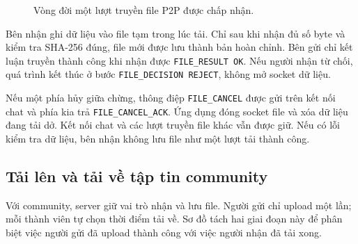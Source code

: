 \begin{figure}[H]
\centering
{}
\caption{Vòng đời một lượt truyền file P2P được chấp nhận.}
\label{fig:seq-file-private}
\end{figure}

Bên nhận ghi dữ liệu vào file tạm trong lúc tải. Chỉ sau khi nhận đủ số byte và
kiểm tra SHA-256 đúng, file mới được lưu thành bản hoàn chỉnh. Bên gửi chỉ kết
luận truyền thành công khi nhận được \texttt{FILE\_RESULT OK}. Nếu người nhận từ chối,
quá trình kết thúc ở bước \texttt{FILE\_DECISION REJECT}, không mở socket dữ liệu.

Nếu một phía hủy giữa chừng, thông điệp \texttt{FILE\_CANCEL} được gửi trên kết nối
chat và phía kia trả \texttt{FILE\_CANCEL\_ACK}. Ứng dụng đóng socket file và xóa dữ
liệu đang tải dở. Kết nối chat và các lượt truyền file khác vẫn được giữ.
Nếu có lỗi kiểm tra dữ liệu, bên nhận không lưu file như một lượt tải thành công.

\clearpage
\subsection{Tải lên và tải về tập tin community}

Với community, server giữ vai trò nhận và lưu file. Người gửi chỉ upload một
lần; mỗi thành viên tự chọn thời điểm tải về. Sơ đồ tách hai giai đoạn này để
phân biệt việc người gửi đã upload thành công với việc người nhận đã tải xong.

